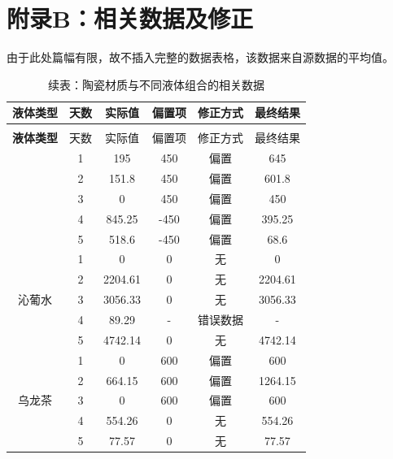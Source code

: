 \documentclass[12pt,a4paper]{ctexart}
\begin{document}
\clearpage
\thispagestyle{empty}
\section{附录B：相关数据及修正}
由于此处篇幅有限，故不插入完整的数据表格，该数据来自源数据的平均值。
\begin{longtable}{c c c c c c}
  \caption{陶瓷材质与不同液体组合的相关数据} \\
  \toprule
  \textbf{液体类型} & 天数 & 实际值 & 偏置项 & 修正方式 & 最终结果 \\
  \midrule
  \endfirsthead  %
  
  \caption*{续表：陶瓷材质与不同液体组合的相关数据} \\
  \toprule
  \textbf{液体类型} & 天数 & 实际值 & 偏置项 & 修正方式 & 最终结果 \\
  \midrule
  \endhead  %
  
  \bottomrule
  \endlastfoot  %

  \multirow{5}{*}{水} 
    & 1 & 195      & 450    & 偏置      & 645      \\
    & 2 & 151.8    & 450    & 偏置       & 601.8    \\
    & 3 & 0        & 450    & 偏置     & 450      \\
    & 4 & 845.25   & -450   & 偏置     & 395.25   \\
    & 5 & 518.6    & -450   & 偏置     & 68.6     \\
  \midrule
  
  \multirow{5}{*}{沁葡水} 
    & 1 & 0        & 0      & 无     & 0        \\
    & 2 & 2204.61  & 0      & 无     & 2204.61  \\
    & 3 & 3056.33  & 0      & 无     & 3056.33  \\
    & 4 & 89.29    & -   & 错误数据     & -  \\
    & 5 & 4742.14  & 0      & 无       & 4742.14  \\
  \midrule
  
  \multirow{5}{*}{乌龙茶} 
    & 1 & 0        & 600    & 偏置     & 600      \\
    & 2 & 664.15   & 600    & 偏置     & 1264.15  \\
    & 3 & 0        & 600    & 偏置     & 600      \\
    & 4 & 554.26   & 0      & 无       & 554.26   \\
    & 5 & 77.57    & 0      & 无       & 77.57    \\

\end{longtable}
\end{document}
